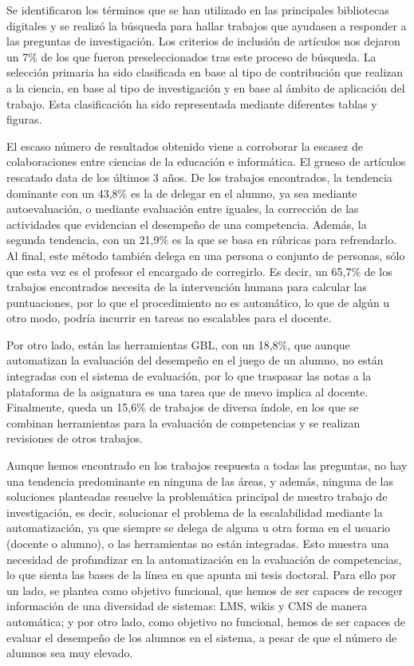 Se identificaron los términos que se han utilizado en las principales bibliotecas digitales y se realizó la búsqueda para hallar trabajos que ayudasen a responder a las preguntas de investigación. Los criterios de inclusión de artículos nos dejaron un 7\% de los que fueron preseleccionados tras este proceso de búsqueda. La selección primaria ha sido clasificada en base al tipo de contribución que realizan a la ciencia, en base al tipo de investigación y en base al ámbito de aplicación del trabajo. Esta clasificación ha sido representada mediante diferentes tablas y figuras.

El escaso número de resultados obtenido viene a corroborar la escasez de colaboraciones entre ciencias de la educación e informática. El grueso de artículos rescatado data de los últimos 3 años. De los trabajos encontrados, la tendencia dominante con un 43,8\% es la de delegar en el alumno, ya sea mediante autoevaluación, o mediante evaluación entre iguales, la corrección de las actividades que evidencian el desempeño de una competencia. Además, la segunda tendencia, con un 21,9\% es la que se basa en rúbricas para refrendarlo. Al final, este método también delega en una persona o conjunto de personas, sólo que esta vez es el profesor el encargado de corregirlo. Es decir, un 65,7\% de los trabajos encontrados necesita de la intervención humana para calcular las puntuaciones, por lo que el procedimiento no es automático, lo que de algún u otro modo, podría incurrir en tareas no escalables para el docente.

Por otro lado, están las herramientas GBL, con un 18,8\%, que aunque automatizan la evaluación del desempeño en el juego de un alumno, no están integradas con el sistema de evaluación, por lo que traspasar las notas a la plataforma de la asignatura es una tarea que de nuevo implica al docente. Finalmente, queda un 15,6\% de trabajos de diversa índole, en los que se combinan herramientas para la evaluación de competencias y se realizan revisiones de otros trabajos.

Aunque hemos encontrado en los trabajos respuesta a todas las preguntas, no hay una tendencia predominante en ninguna de las áreas, y además, ninguna de las soluciones planteadas resuelve la problemática principal de nuestro trabajo de investigación, es decir, solucionar el problema de la escalabilidad mediante la automatización, ya que siempre se delega de alguna u otra forma en el usuario (docente o alumno), o las herramientas no están integradas. Esto muestra una necesidad de profundizar en la automatización en la evaluación de competencias, lo que sienta las bases de la línea en que apunta mi tesis doctoral. Para ello por un lado, se plantea como objetivo funcional, que hemos de ser capaces de recoger información de una diversidad de sistemas: LMS, wikis y CMS de manera automática; y por otro lado, como objetivo no funcional, hemos de ser capaces de evaluar el desempeño de los alumnos en el sistema, a pesar de que el número de alumnos sea muy elevado.





